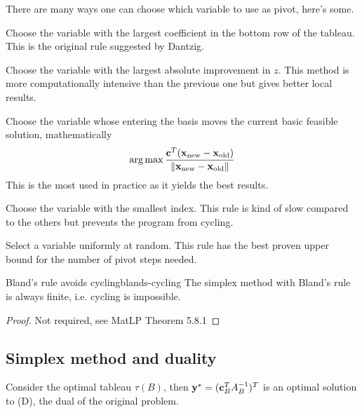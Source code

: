 \documentclass[12pt]{extarticle}
\renewcommand{\vec}[1]{\bvec{#1}}
\begin{document}
There are many ways one can choose which variable to use as pivot, here's some.
\begin{description}[font=\normalfont\itshape]
	\item[Largest coefficient] Choose the variable with the largest coefficient in the bottom row of
	      the tableau. This is the original rule suggested by Dantzig.
	\item[Largest increase] Choose the variable with the largest absolute improvement in $z$. This
	      method is more computationally intensive than the previous one but gives better local results.
	\item[Steepest edge] Choose the variable whose entering the basis moves the current basic feasible
	      solution, mathematically
	      \begin{equation}
		      \argmax \frac{\vec c^T(\vec x_\text{new} - \vec x_\text{old})}
		      {\norm{\vec x_\text{new} - \vec x_\text{old}}}
	      \end{equation}
	      This is the most used in practice as it yields the best results.
	\item[Bland's rule] Choose the variable with the smallest index. This rule is kind of slow
	      compared to the others but prevents the program from cycling.
	\item[Random edge] Select a variable uniformly at random. This rule has the best proven upper
	      bound for the number of pivot steps needed.
\end{description}

\begin{theorem}{Bland's rule avoids cycling}{blands-cycling}
	The simplex method with Bland's rule is always finite, i.e. cycling is impossible.
\end{theorem}

\begin{proof}
	Not required, see MatLP Theorem 5.8.1
\end{proof}

\subsection{Simplex method and duality}

\begin{lemma}{}{}
	Consider the optimal tableau $\tau(B)$, then $\vec y^* = (\vec c^T_B A_B^{-1})^T$ is an optimal solution to
	(D), the dual of the original problem.
\end{lemma}
\end{document}
